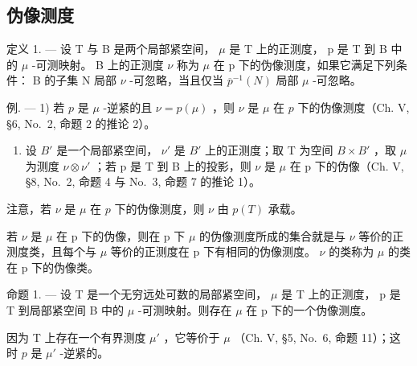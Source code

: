 \subsection{伪像测度}

定义 1. --- 设 T 与 B 是两个局部紧空间， \(\mu\) 是 T 上的正测度， p 是 T 到 B 中的 \(\mu\) -可测映射。 B 上的正测度 \(\nu\) 称为 \(\mu\) 在 p 下的伪像测度，如果它满足下列条件： B 的子集 N 局部 \(\nu\) -可忽略，当且仅当 \(\overline{p}^{-1}(N)\) 局部 \(\mu\) -可忽略。

例. --- 1) 若 \(p\) 是 \(\mu\) -逆紧的且 \(\nu = p(\mu)\) ，则 \(\nu\) 是 \(\mu\) 在 \(p\) 下的伪像测度（Ch. V, §6, No.~2, 命题 2 的推论 2）。

\begin{enumerate}
\def\labelenumi{\arabic{enumi})}
\setcounter{enumi}{1}
\tightlist
\item
  设 \(B'\) 是一个局部紧空间， \(\nu'\) 是 \(B'\) 上的正测度；取 T 为空间 \(B \times B'\) ，取 \(\mu\) 为测度 \(\nu \otimes \nu'\) ；若 p 是 T 到 B 上的投影，则 \(\nu\) 是 \(\mu\) 在 p 下的伪像（Ch. V, §8, No.~2, 命题 4 与 No.~3, 命题 7 的推论 1）。
\end{enumerate}

注意，若 \(\nu\) 是 \(\mu\) 在 \(p\) 下的伪像测度，则 \(\nu\) 由 \(p(T)\) 承载。

若 \(\nu\) 是 \(\mu\) 在 p 下的伪像，则在 p 下 \(\mu\) 的伪像测度所成的集合就是与 \(\nu\) 等价的正测度类，且每个与 \(\mu\) 等价的正测度在 p 下有相同的伪像测度。 \(\nu\) 的类称为 \(\mu\) 的类在 p 下的伪像类。

命题 1. --- 设 T 是一个无穷远处可数的局部紧空间， \(\mu\) 是 T 上的正测度， p 是 T 到局部紧空间 B 中的 \(\mu\) -可测映射。则存在 \(\mu\) 在 p 下的一个伪像测度。

因为 T 上存在一个有界测度 \(\mu'\) ，它等价于 \(\mu\) （Ch. V, §5, No.~6, 命题 11）；这时 \(p\) 是 \(\mu'\) -逆紧的。

